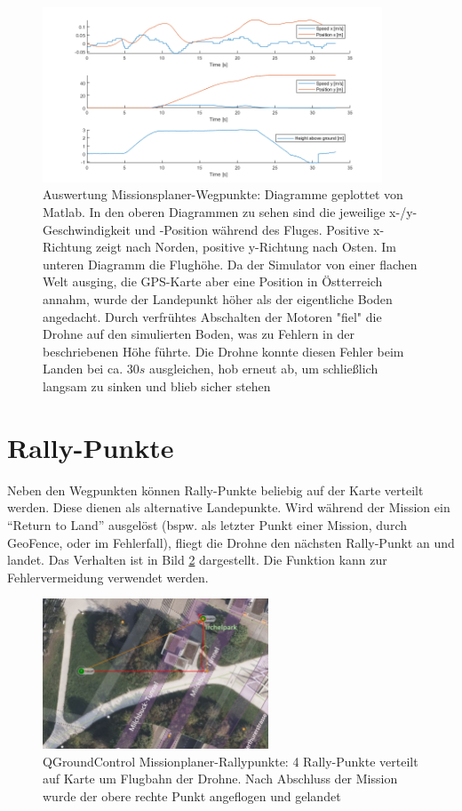 \begin{figure}[h]
    \centering
    \includegraphics[width=0.9\textwidth]{images/mission_plan_mission_dia.png}
    \caption[Auswertung Missionsplaner-Wegpunkte]{Auswertung Missionsplaner-Wegpunkte: Diagramme geplottet von Matlab. In den oberen Diagrammen zu sehen sind die jeweilige x-/y-Geschwindigkeit und -Position während des Fluges. Positive x-Richtung zeigt nach Norden, positive y-Richtung nach Osten. Im unteren Diagramm die Flughöhe. Da der Simulator von einer flachen Welt ausging, die GPS-Karte aber eine Position in Östterreich annahm, wurde der Landepunkt höher als der eigentliche Boden angedacht. Durch verfrühtes Abschalten der Motoren "fiel" die Drohne auf den simulierten Boden, was zu Fehlern in der beschriebenen Höhe führte. Die Drohne konnte diesen Fehler beim Landen bei ca. $30s$ ausgleichen, hob erneut ab, um schließlich langsam zu sinken und blieb sicher stehen}
    \label{fig:qgc_mission_plan_wp_dia}
\end{figure}

\section{Rally-Punkte}
Neben den Wegpunkten können Rally-Punkte beliebig auf der Karte verteilt werden. Diese dienen als alternative Landepunkte. Wird während der Mission ein \enquote{Return to Land} ausgelöst (bspw. als letzter Punkt einer Mission, durch GeoFence, oder im Fehlerfall), fliegt die Drohne den nächsten Rally-Punkt an und landet. Das Verhalten ist in Bild \ref{fig:qgc_mission_plan_rp} dargestellt. Die Funktion kann zur Fehlervermeidung verwendet werden.

\begin{figure}[h]
    \centering
    \includegraphics[width=0.6\textwidth]{images/mission_plan_rally.png}
    \caption[QGroundControl Missionplaner-Rallypunkte]{QGroundControl Missionplaner-Rallypunkte: 4 Rally-Punkte verteilt auf Karte um Flugbahn der Drohne. Nach Abschluss der Mission wurde der obere rechte Punkt angeflogen und gelandet}
    \label{fig:qgc_mission_plan_rp}
\end{figure}

